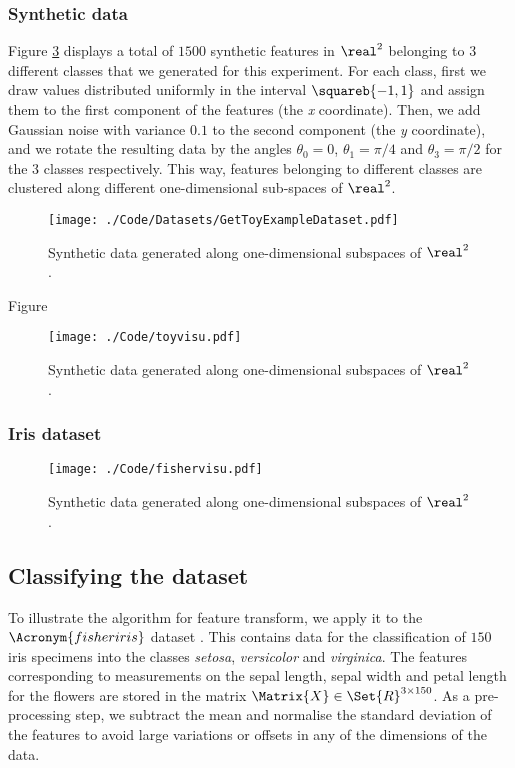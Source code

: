 \documentclass{article}
\def \Feas{\Matrix{X}} 	%
\def \ambient{\Set{R}} 						%
\begin{document}
\subsubsection{Synthetic data}
Figure \ref{fig:toy} displays a total of $1500$ synthetic features in $\real^{2}$ belonging to $3$ different classes that we generated for this experiment. For each class, first we draw values distributed uniformly in the interval $\squareb{-1,1}$ and assign them to the first component of the features (the \emph{x} coordinate). Then, we add Gaussian noise with variance $0.1$ to the second component (the \emph{y} coordinate), and we rotate the resulting data by the angles $\theta_{0}=0$, $\theta_{1}=\pi/4$ and $\theta_{3}=\pi/2$ for the $3$ classes respectively. This way, features belonging to different classes are clustered along different one-dimensional sub-spaces of $\real^{2}$.
\begin{figure}
\texttt{[image: ./Code/Datasets/GetToyExampleDataset.pdf]}
\caption{\label{fig:toy}Synthetic data generated along one-dimensional subspaces of $\real^{2}$.}
\end{figure}

Figure
\begin{figure}
\texttt{[image: ./Code/toyvisu.pdf]}
\caption{\label{fig:toy}Synthetic data generated along one-dimensional subspaces of $\real^{2}$.}
\end{figure}
\subsubsection{Iris dataset}
\begin{figure}
\texttt{[image: ./Code/fishervisu.pdf]}
\caption{\label{fig:toy}Synthetic data generated along one-dimensional subspaces of $\real^{2}$.}
\end{figure}

\subsection{Classifying the  dataset}\label{sec:fisher}
To illustrate the  algorithm for feature transform, we apply it to the $\Acronym{fisheriris}$ dataset \cite{Fisher1936Th}. This contains data for the classification of $150$ iris specimens into the classes \emph{setosa}, \emph{versicolor} and \emph{virginica}. The features corresponding to measurements on the sepal length, sepal width and petal length for the flowers are stored in the matrix $\Feas\in\ambient^{3\times 150}$.  As a pre-processing step, we subtract the mean and normalise the standard deviation of the features to avoid large variations or offsets in any of the dimensions of the data.
\end{document}
